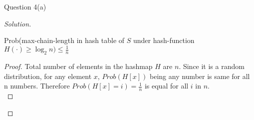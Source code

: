 \begin{solution}{Question 4(a)}\label{ques:41}
    \begin{question}
        
    \end{question}
    \tcblower{}
    \begin{proof}[Solution]
        \begin{claim}\label{claim:q1}
        Prob(max-chain-length in hash table of $S$ under hash-function $H(\cdot)\geq \log_2 n) \leq \frac{1}{n}$
        \end{claim}
        \begin{proof}
        Total number of elements in the hashmap $H$ are $n$. Since it is a random distribution, for any element $x$, $Prob(H[x])$ being any number is same for all n numbers. Therefore $Prob(H[x]=i)=\frac{1}{n}$ is equal for all $i$ in $n$.\\
        
        \end{proof}
        
    \end{proof}
\end{solution}
